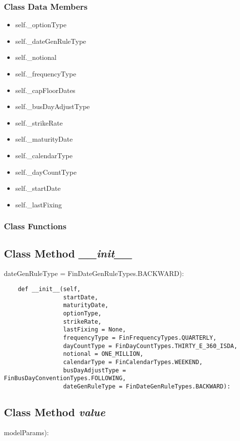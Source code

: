 \documentclass[twoside,11pt]{book}
\begin{document}
\subsubsection{Class Data Members}
\begin{itemize}
\item{self.\_optionType}
\item{self.\_dateGenRuleType}
\item{self.\_notional}
\item{self.\_frequencyType}
\item{self.\_capFloorDates}
\item{self.\_busDayAdjustType}
\item{self.\_strikeRate}
\item{self.\_maturityDate}
\item{self.\_calendarType}
\item{self.\_dayCountType}
\item{self.\_startDate}
\item{self.\_lastFixing}
\end{itemize}

\subsubsection{Class Functions}

\subsection{Class Method {\it \_\_init\_\_}}
dateGenRuleType = FinDateGenRuleTypes.BACKWARD):

\begin{lstlisting}
    def __init__(self, 
                 startDate,
                 maturityDate,
                 optionType,
                 strikeRate,
                 lastFixing = None,
                 frequencyType = FinFrequencyTypes.QUARTERLY,
                 dayCountType = FinDayCountTypes.THIRTY_E_360_ISDA,
                 notional = ONE_MILLION, 
                 calendarType = FinCalendarTypes.WEEKEND,
                 busDayAdjustType = FinBusDayConventionTypes.FOLLOWING,
                 dateGenRuleType = FinDateGenRuleTypes.BACKWARD):
\end{lstlisting}

\subsection{Class Method {\it value}}
modelParams):
\end{document}
